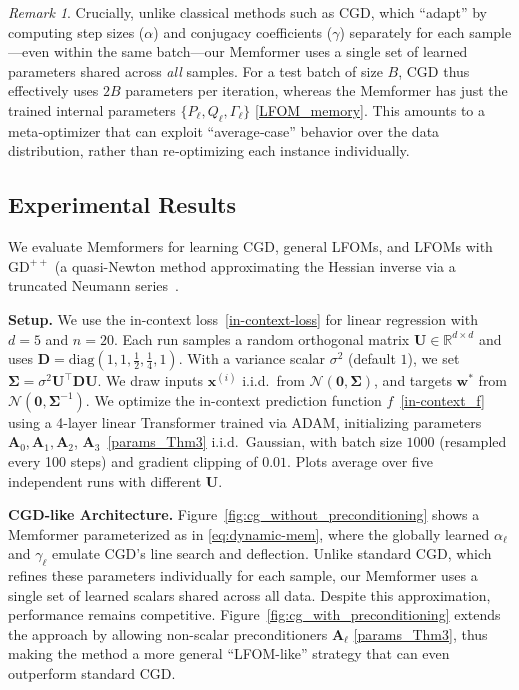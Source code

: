 \documentclass[11pt]{article}
\theoremstyle{plain}
\theoremstyle{definition}
\theoremstyle{remark}
\newtheorem{remark}[theorem]{Remark}
\numberwithin{equation}{section}
\begin{document}
\begin{remark}
\label{rmk:cgd}
Crucially, unlike classical methods such as CGD, which ``adapt'' by computing step sizes (\(\alpha\)) and conjugacy coefficients (\(\gamma\)) separately for each sample—even within the same batch—our Memformer uses a single set of learned parameters shared across \emph{all} samples. For a test batch of size \(B\), CGD thus effectively uses \(2B\) parameters per iteration, whereas the Memformer has just the trained internal parameters \(\{P_\ell, Q_\ell, \Gamma_\ell\}\) \eqref{LFOM_memory}. This amounts to a meta‐optimizer that can exploit “average‐case” behavior over the data distribution, rather than re‐optimizing each instance individually.
\end{remark}

\subsection{Experimental Results}
\label{Section:Experimental_Results}
We evaluate Memformers for learning CGD, general LFOMs, and LFOMs with \(\mathrm{GD}^{++}\) (a quasi-Newton method approximating the Hessian inverse via a truncated Neumann series~\citep{von2023transformers}.

\textbf{Setup.} We use the in-context loss~\eqref{in-context-loss} for linear regression with $d=5$ and $n=20$. Each run samples a random orthogonal matrix $\mathbf{U}\in\mathbb{R}^{d\times d}$ and uses $\mathbf{D} = \mathrm{diag}(1, 1, \tfrac12, \tfrac14, 1)$. With a variance scalar $\sigma^2$ (default $1$), we set $\mathbf{\Sigma} = \sigma^2 \mathbf{U}^\top \mathbf{D} \mathbf{U}$. We draw inputs $\mathbf{x}^{(i)}$ i.i.d.\ from $\mathcal{N}(\mathbf{0}, \mathbf{\Sigma})$, and targets $\mathbf{w}^*$ from $\mathcal{N}(\mathbf{0}, \mathbf{\Sigma}^{-1})$. We optimize the in-context prediction function $f$~\eqref{in-context_f} using a 4-layer linear Transformer trained via ADAM, initializing parameters $\mathbf{A}_0, \mathbf{A}_1, \mathbf{A}_2$, $\mathbf{A}_3$~\eqref{params_Thm3} i.i.d.\ Gaussian, with batch size $1000$ (resampled every 100 steps) and gradient clipping of $0.01$. Plots average over five independent runs with different $\mathbf{U}$.

\textbf{CGD-like Architecture.} 
Figure~\ref{fig:cg_without_preconditioning} shows a Memformer parameterized as in \eqref{eq:dynamic-mem}, where the globally learned \(\alpha_\ell\) and \(\gamma_\ell\) emulate CGD’s line search and deflection. Unlike standard CGD, which refines these parameters individually for each sample, our Memformer uses a single set of learned scalars shared across all data. Despite this approximation, performance remains competitive. Figure~\ref{fig:cg_with_preconditioning} extends the approach by allowing non-scalar preconditioners \(\mathbf{A}_\ell\) \eqref{params_Thm3}, thus making the method a more general ``LFOM-like” strategy that can even outperform standard CGD.
\end{document}
